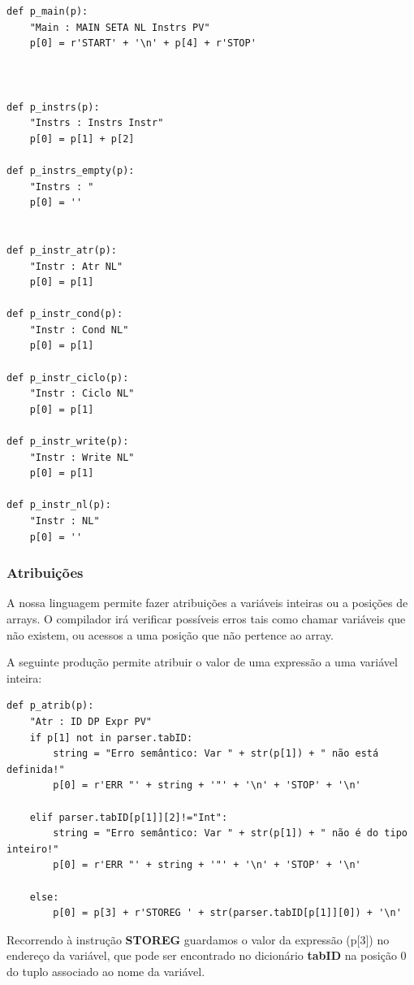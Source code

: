 \documentclass{article}
\begin{document}
\begin{lstlisting}[firstnumber=137]
def p_main(p):
    "Main : MAIN SETA NL Instrs PV"
    p[0] = r'START' + '\n' + p[4] + r'STOP'



def p_instrs(p):
    "Instrs : Instrs Instr"
    p[0] = p[1] + p[2]

def p_instrs_empty(p):
    "Instrs : "
    p[0] = ''


def p_instr_atr(p):
    "Instr : Atr NL"
    p[0] = p[1]

def p_instr_cond(p):
    "Instr : Cond NL"
    p[0] = p[1]

def p_instr_ciclo(p):
    "Instr : Ciclo NL"
    p[0] = p[1]

def p_instr_write(p):
    "Instr : Write NL"
    p[0] = p[1]

def p_instr_nl(p):
    "Instr : NL"
    p[0] = ''
\end{lstlisting}


\subsubsection {Atribuições}
\setlength{\parindent}{5ex} A nossa linguagem permite fazer atribuições a variáveis inteiras ou a posições de arrays. O compilador irá verificar possíveis erros tais como chamar variáveis que não existem, ou acessos a uma posição que não pertence ao array.
\par A seguinte produção permite atribuir o valor de uma expressão a uma variável inteira:

\begin{lstlisting}[firstnumber=174]
def p_atrib(p):
    "Atr : ID DP Expr PV"
    if p[1] not in parser.tabID:
        string = "Erro semântico: Var " + str(p[1]) + " não está definida!"
        p[0] = r'ERR "' + string + '"' + '\n' + 'STOP' + '\n'

    elif parser.tabID[p[1]][2]!="Int":
        string = "Erro semântico: Var " + str(p[1]) + " não é do tipo inteiro!"
        p[0] = r'ERR "' + string + '"' + '\n' + 'STOP' + '\n'     
    
    else:
        p[0] = p[3] + r'STOREG ' + str(parser.tabID[p[1]][0]) + '\n'
\end{lstlisting}

Recorrendo à instrução \textbf{STOREG} guardamos o valor da expressão (p[3]) no endereço da variável, que pode ser encontrado no dicionário \textbf{tabID} na posição 0 do tuplo associado ao nome da variável.
\end{document}
